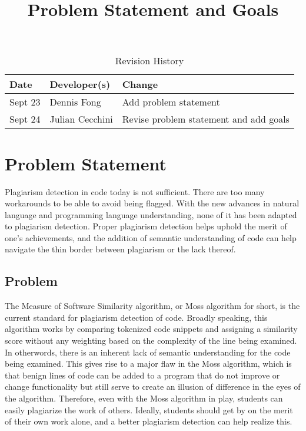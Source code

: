 \documentclass{article}
\title{Problem Statement and Goals\\\progname}
\author{\authname}
\date{}
\begin{document}
\maketitle

\begin{table}[hp]
\caption{Revision History} \label{TblRevisionHistory}
\begin{tabularx}{\textwidth}{llX}
\toprule
\textbf{Date} & \textbf{Developer(s)} & \textbf{Change}\\
\midrule
Sept 23 & Dennis Fong & Add problem statement\\
Sept 24 & Julian Cecchini & Revise problem statement and add goals\\
\bottomrule
\end{tabularx}
\end{table}

\section{Problem Statement}

Plagiarism detection in code today is not sufficient. There are too many
workarounds to be able to avoid being flagged. With the new advances in natural
language and programming language understanding, none of it has been adapted to
plagiarism detection. Proper plagiarism detection helps uphold the merit of
one's achievements, and the addition of semantic understanding of code can help
navigate the thin border between plagiarism or the lack thereof. 


\subsection{Problem}
The Measure of Software Similarity algorithm, or Moss algorithm for short, is
the current standard for plagiarism detection of code. Broadly speaking, this
algorithm works by comparing tokenized code snippets and assigning a similarity
score without any weighting based on the complexity of the line being examined.
In otherwords, there is an inherent lack of semantic understanding for the code
being examined. This gives rise to a major flaw in the Moss algorithm, which is
that benign lines of code can be added to a program that do not improve or
change functionality but still serve to create an illusion of difference in the
eyes of the algorithm. Therefore, even with the Moss algorithm in play, students
can easily plagiarize the work of others. Ideally, students should get by on the
merit of their own work alone, and a better plagiarism detection can help
realize this.
\end{document}
